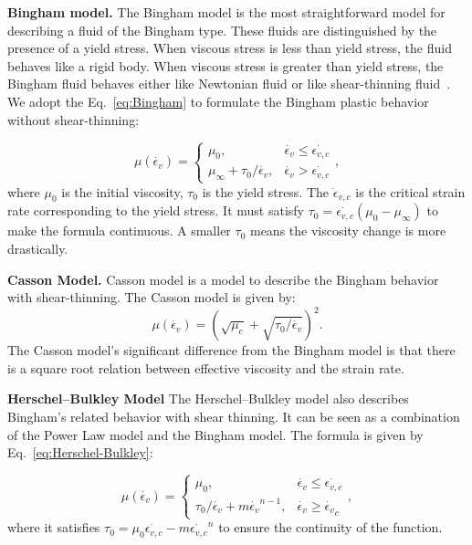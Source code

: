 \documentclass[10pt,journal,compsoc]{IEEEtran}
\begin{document}
\textbf{Bingham model.}
The Bingham model is the most straightforward model for describing a fluid of the Bingham type. These fluids are distinguished by the presence of a yield stress. When viscous stress is less than yield stress, the fluid behaves like a rigid body. When viscous stress is greater than yield stress, the Bingham fluid behaves either like Newtonian fluid or like shear-thinning fluid~\cite{Zhu2015-nonNewton}.
We adopt the Eq.~\ref{eq:Bingham} to formulate the Bingham plastic behavior without shear-thinning:

\begin{equation}
	\mu(\dot{\epsilon_v})= \begin{cases}\mu_0, & \dot{\epsilon_v} \leq \dot{\epsilon_{v,c}} \\ \mu_{\infty}+\tau_0 / \dot{\epsilon_v}, & \dot{\epsilon_v}>\dot{\epsilon_{v,c}}\end{cases}, \label{eq:Bingham}
\end{equation}
where $\mu_0$ is the initial viscosity, $\tau_0$ is the yield stress. The $\dot\epsilon_{v,c}$ is the critical strain rate corresponding to the yield stress. It must satisfy $\tau_0=\dot{\epsilon_{v,c}}\left(\mu_0-\mu_{\infty}\right)$ to make the formula continuous. A smaller $\tau_0$ means the viscosity change is more drastically.


\textbf{Casson Model.}
Casson model is a model to describe the Bingham behavior with shear-thinning. The Casson model is given by:
\begin{equation}
	\mu(\dot{\epsilon_v}) =\left(\sqrt{\mu_c}+\sqrt{ \tau_0 / \dot{\epsilon_v}}\right)^2.  \label{Casson-model}
\end{equation}
The Casson model's significant difference from the Bingham model is that there is a square root relation between effective viscosity and the strain rate.

\textbf{Herschel–Bulkley Model}
The Herschel–Bulkley model also describes Bingham's related behavior with shear thinning. It can be seen as a combination of the Power Law model and the Bingham model. The formula is given by Eq.~\ref{eq:Herschel-Bulkley}:


\begin{equation}
	\mu(\dot{\epsilon_v})= \begin{cases}\mu_0, & \dot{\epsilon_v} \leq \dot{\epsilon_{v,c}} \\ \tau_0/\dot{\epsilon_v}+m\dot{\epsilon_v}^{n-1}, & \dot{\epsilon_v} \geq \dot{\epsilon_v}_c\end{cases},
	\label{eq:Herschel-Bulkley}
\end{equation}
where it satisfies $\tau_0 = \mu_0 \dot{\epsilon_{v,c}} - m \dot{\epsilon_{v,c}}^n$ to ensure the continuity of the function.
\end{document}
